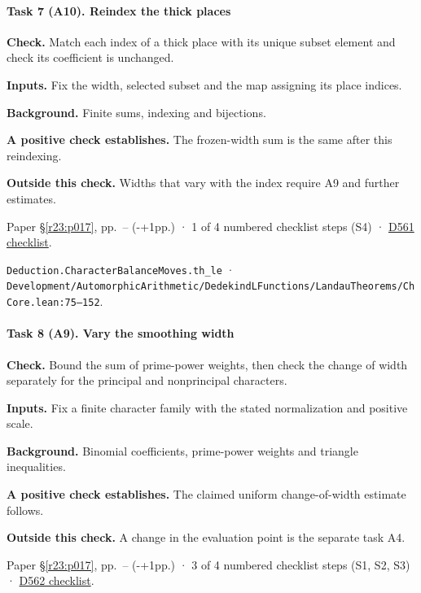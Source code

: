 \paragraph{Task 7 (A10). Reindex the thick places}\label{v7:task-7}

\textbf{Check.} Match each index of a thick place with its unique subset element and check its coefficient is unchanged.

\textbf{Inputs.} Fix the width, selected subset and the map assigning its place indices.

\textbf{Background.} Finite sums, indexing and bijections.

\textbf{A positive check establishes.} The frozen-width sum is the same after this reindexing.

\textbf{Outside this check.} Widths that vary with the index require A9 and further estimates.

Paper \S\ref{r23:p017}, pp.\ \pageref{r24:thick}--\pageref{v5:thick-end} (\number\numexpr{}-+1\relax pp.) · 1 of 4 numbered checklist steps (S4) · \href{https://github.com/GunheeC/rh-lean-verification-atlas/blob/v0.1.0/units/D561.check.md}{D561 checklist}.

\nolinkurl{Deduction.CharacterBalanceMoves.th_le} · \nolinkurl{Development/AutomorphicArithmetic/DedekindLFunctions/LandauTheorems/ChCore.lean:75–152}.

\paragraph{Task 8 (A9). Vary the smoothing width}\label{v7:task-8}

\textbf{Check.} Bound the sum of prime-power weights, then check the change of width separately for the principal and nonprincipal characters.

\textbf{Inputs.} Fix a finite character family with the stated normalization and positive scale.

\textbf{Background.} Binomial coefficients, prime-power weights and triangle inequalities.

\textbf{A positive check establishes.} The claimed uniform change-of-width estimate follows.

\textbf{Outside this check.} A change in the evaluation point is the separate task A4.

Paper \S\ref{r23:p017}, pp.\ \pageref{r24:regular}--\pageref{v5:regular-end} (\number\numexpr{}-+1\relax pp.) · 3 of 4 numbered checklist steps (S1, S2, S3) · \href{https://github.com/GunheeC/rh-lean-verification-atlas/blob/v0.1.0/units/D562.check.md}{D562 checklist}.

